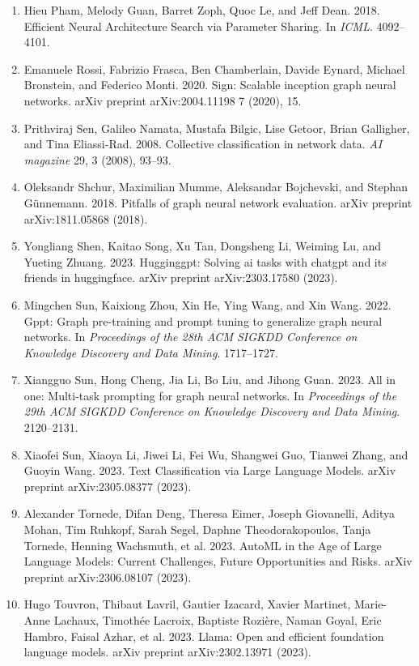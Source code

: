 \documentclass[11pt,UTF8,fontset=fandol]{ctexart}
\begin{document}
\begin{enumerate}[leftmargin=2em,labelsep=0.5em]
\item Hieu Pham, Melody Guan, Barret Zoph, Quoc Le, and Jeff Dean. 2018. Efficient Neural Architecture Search via Parameter Sharing. In \textit{ICML}. 4092--4101.
\item Emanuele Rossi, Fabrizio Frasca, Ben Chamberlain, Davide Eynard, Michael Bronstein, and Federico Monti. 2020. Sign: Scalable inception graph neural networks. arXiv preprint arXiv:2004.11198 7 (2020), 15.
\item Prithviraj Sen, Galileo Namata, Mustafa Bilgic, Lise Getoor, Brian Galligher, and Tina Eliassi-Rad. 2008. Collective classification in network data. \textit{AI magazine} 29, 3 (2008), 93--93.
\item Oleksandr Shchur, Maximilian Mumme, Aleksandar Bojchevski, and Stephan G\"unnemann. 2018. Pitfalls of graph neural network evaluation. arXiv preprint arXiv:1811.05868 (2018).
\item Yongliang Shen, Kaitao Song, Xu Tan, Dongsheng Li, Weiming Lu, and Yueting Zhuang. 2023. Hugginggpt: Solving ai tasks with chatgpt and its friends in huggingface. arXiv preprint arXiv:2303.17580 (2023).
\item Mingchen Sun, Kaixiong Zhou, Xin He, Ying Wang, and Xin Wang. 2022. Gppt: Graph pre-training and prompt tuning to generalize graph neural networks. In \textit{Proceedings of the 28th ACM SIGKDD Conference on Knowledge Discovery and Data Mining}. 1717--1727.
\item Xiangguo Sun, Hong Cheng, Jia Li, Bo Liu, and Jihong Guan. 2023. All in one: Multi-task prompting for graph neural networks. In \textit{Proceedings of the 29th ACM SIGKDD Conference on Knowledge Discovery and Data Mining}. 2120--2131.
\item Xiaofei Sun, Xiaoya Li, Jiwei Li, Fei Wu, Shangwei Guo, Tianwei Zhang, and Guoyin Wang. 2023. Text Classification via Large Language Models. arXiv preprint arXiv:2305.08377 (2023).
\item Alexander Tornede, Difan Deng, Theresa Eimer, Joseph Giovanelli, Aditya Mohan, Tim Ruhkopf, Sarah Segel, Daphne Theodorakopoulos, Tanja Tornede, Henning Wachsmuth, et al. 2023. AutoML in the Age of Large Language Models: Current Challenges, Future Opportunities and Risks. arXiv preprint arXiv:2306.08107 (2023).
\item Hugo Touvron, Thibaut Lavril, Gautier Izacard, Xavier Martinet, Marie-Anne Lachaux, Timoth\'ee Lacroix, Baptiste Rozi\`ere, Naman Goyal, Eric Hambro, Faisal Azhar, et al. 2023. Llama: Open and efficient foundation language models. arXiv preprint arXiv:2302.13971 (2023).

\end{enumerate}
\end{document}
